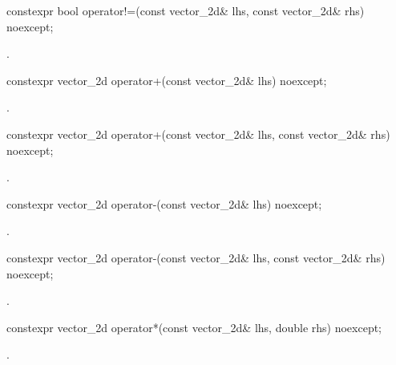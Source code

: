 \begin{itemdecl}
constexpr bool operator!=(const vector_2d& lhs, const vector_2d& rhs) noexcept;
\end{itemdecl}
\begin{itemdescr}
\pnum
\returns
{}.
\end{itemdescr}

\begin{itemdecl}
constexpr vector_2d operator+(const vector_2d& lhs) noexcept;
\end{itemdecl}
\begin{itemdescr}
\pnum
\returns
{}.
\end{itemdescr}

\begin{itemdecl}
constexpr vector_2d operator+(const vector_2d& lhs, const vector_2d& rhs) noexcept;
\end{itemdecl}
\begin{itemdescr}
\pnum
\returns
{}.
\end{itemdescr}

\begin{itemdecl}
constexpr vector_2d operator-(const vector_2d& lhs) noexcept;
\end{itemdecl}
\begin{itemdescr}
\pnum
\returns
{}.
\end{itemdescr}

\begin{itemdecl}
constexpr vector_2d operator-(const vector_2d& lhs, const vector_2d& rhs) 
  noexcept;
\end{itemdecl}
\begin{itemdescr}
\pnum
\returns
{}.
\end{itemdescr}

\begin{itemdecl}
constexpr vector_2d operator*(const vector_2d& lhs, double rhs) noexcept;
\end{itemdecl}
\begin{itemdescr}
\pnum
\returns
{}.
\end{itemdescr}

